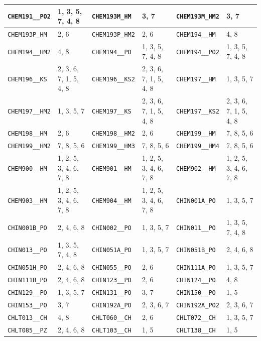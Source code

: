 \begin{longtable}{|l|l||l|l||l|l|}
    \verb|CHEM191__PO2| & 1, 3, 5, 7, 4, 8 & \verb|CHEM193M_HM| & 3, 7 & \verb|CHEM193M_HM2| & 3, 7\\\hline
    \verb|CHEM193P_HM| & 2, 6 & \verb|CHEM193P_HM2| & 2, 6 & \verb|CHEM194__HM| & 4, 8\\\hline
    \verb|CHEM194__HM2| & 4, 8 & \verb|CHEM194__PO| & 1, 3, 5, 7, 4, 8 & \verb|CHEM194__PO2| & 1, 3, 5, 7, 4, 8\\\hline
    \verb|CHEM196__KS| & 2, 3, 6, 7, 1, 5, 4, 8 & \verb|CHEM196__KS2| & 2, 3, 6, 7, 1, 5, 4, 8 & \verb|CHEM197__HM| & 1, 3, 5, 7\\\hline
    \verb|CHEM197__HM2| & 1, 3, 5, 7 & \verb|CHEM197__KS| & 2, 3, 6, 7, 1, 5, 4, 8 & \verb|CHEM197__KS2| & 2, 3, 6, 7, 1, 5, 4, 8\\\hline
    \verb|CHEM198__HM| & 2, 6 & \verb|CHEM198__HM2| & 2, 6 & \verb|CHEM199__HM| & 7, 8, 5, 6\\\hline
    \verb|CHEM199__HM2| & 7, 8, 5, 6 & \verb|CHEM199__HM3| & 7, 8, 5, 6 & \verb|CHEM199__HM4| & 7, 8, 5, 6\\\hline
    \verb|CHEM900__HM| & 1, 2, 5, 3, 4, 6, 7, 8 & \verb|CHEM901__HM| & 1, 2, 5, 3, 4, 6, 7, 8 & \verb|CHEM902__HM| & 1, 2, 5, 3, 4, 6, 7, 8\\\hline
    \verb|CHEM903__HM| & 1, 2, 5, 3, 4, 6, 7, 8 & \verb|CHEM904__HM| & 1, 2, 5, 3, 4, 6, 7, 8 & \verb|CHIN001A_PO| & 1, 3, 5, 7\\\hline
    \verb|CHIN001B_PO| & 2, 4, 6, 8 & \verb|CHIN002__PO| & 1, 3, 5, 7 & \verb|CHIN011__PO| & 1, 3, 5, 7, 4, 8\\\hline
    \verb|CHIN013__PO| & 1, 3, 5, 7, 4, 8 & \verb|CHIN051A_PO| & 1, 3, 5, 7 & \verb|CHIN051B_PO| & 2, 4, 6, 8\\\hline
    \verb|CHIN051H_PO| & 2, 4, 6, 8 & \verb|CHIN055__PO| & 2, 6 & \verb|CHIN111A_PO| & 1, 3, 5, 7\\\hline
    \verb|CHIN111B_PO| & 2, 4, 6, 8 & \verb|CHIN123__PO| & 2, 6 & \verb|CHIN124__PO| & 4, 8\\\hline
    \verb|CHIN129__PO| & 1, 3, 5, 7 & \verb|CHIN131__PO| & 3, 7 & \verb|CHIN150__PO| & 1, 5\\\hline
    \verb|CHIN153__PO| & 3, 7 & \verb|CHIN192A_PO| & 2, 3, 6, 7 & \verb|CHIN192A_PO2| & 2, 3, 6, 7\\\hline
    \verb|CHLT013__CH| & 4, 8 & \verb|CHLT060__CH| & 2, 6 & \verb|CHLT072__CH| & 1, 3, 5, 7\\\hline
    \verb|CHLT085__PZ| & 2, 4, 6, 8 & \verb|CHLT103__CH| & 1, 5 & \verb|CHLT138__CH| & 1, 5\\\hline

\end{longtable}
